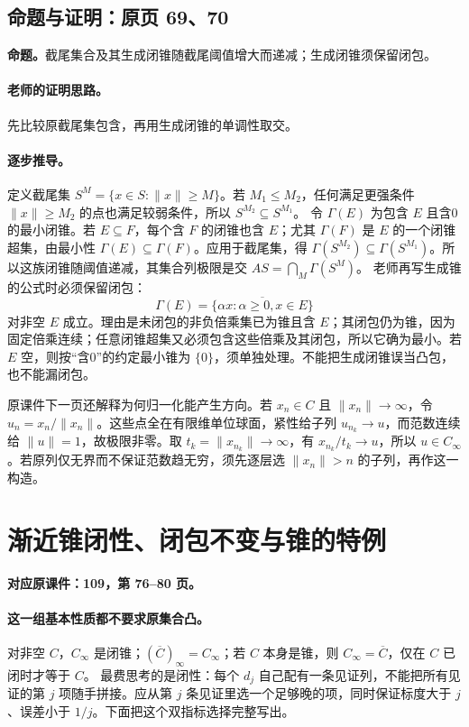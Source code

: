 \subsection{命题与证明：原页 69、70}

\textbf{命题。}截尾集合及其生成闭锥随截尾阈值增大而递减；生成闭锥须保留闭包。

\paragraph{老师的证明思路。}先比较原截尾集包含，再用生成闭锥的单调性取交。

\paragraph{逐步推导。}
定义截尾集 $S^M=\{x\in S:\|x\|\ge M\}$。若 $M_1\le M_2$，任何满足更强条件 $\|x\|\ge M_2$ 的点也满足较弱条件，所以 $S^{M_2}\subseteq S^{M_1}$。
令 $\Gamma(E)$ 为包含 $E$ 且含0的最小闭锥。若 $E\subseteq F$，每个含 $F$ 的闭锥也含 $E$；尤其 $\Gamma(F)$ 是 $E$ 的一个闭锥超集，由最小性 $\Gamma(E)\subseteq\Gamma(F)$。应用于截尾集，得 $\Gamma(S^{M_2})\subseteq\Gamma(S^{M_1})$。所以这族闭锥随阈值递减，其集合列极限是交 $A S=\bigcap_M\Gamma(S^M)$。
老师再写生成锥的公式时必须保留闭包：
\[\Gamma(E)=\overline{\{\alpha x:\alpha\ge0,x\in E\}}\]
对非空 $E$ 成立。理由是未闭包的非负倍乘集已为锥且含 $E$；其闭包仍为锥，因为固定倍乘连续；任意闭锥超集又必须包含这些倍乘及其闭包，所以它确为最小。若 $E$ 空，则按“含0”的约定最小锥为 $\{0\}$，须单独处理。不能把生成闭锥误当凸包，也不能漏闭包。

原课件下一页还解释为何归一化能产生方向。若 $x_n\in C$ 且 $\|x_n\|\to\infty$，令 $u_n=x_n/\|x_n\|$。这些点全在有限维单位球面，紧性给子列 $u_{n_k}\to u$，而范数连续给 $\|u\|=1$，故极限非零。取 $t_k=\|x_{n_k}\|\to\infty$，有 $x_{n_k}/t_k\to u$，所以 $u\in C_\infty$。若原列仅无界而不保证范数趋无穷，须先逐层选 $\|x_n\|>n$ 的子列，再作这一构造。


\clearpage\section{渐近锥闭性、闭包不变与锥的特例}\label{g:109:76}

\textbf{对应原课件：109，第 76--80 页。}


\paragraph{这一组基本性质都不要求原集合凸。}
对非空 $C$，$C_\infty$ 是闭锥；$(\overline C)_\infty=C_\infty$；若 $C$ 本身是锥，则 $C_\infty=\overline C$，仅在 $C$ 已闭时才等于 $C$。
最费思考的是闭性：每个 $d_j$ 自己配有一条见证列，不能把所有见证的第 $j$ 项随手拼接。应从第 $j$ 条见证里选一个足够晚的项，同时保证标度大于 $j$、误差小于 $1/j$。下面把这个双指标选择完整写出。



